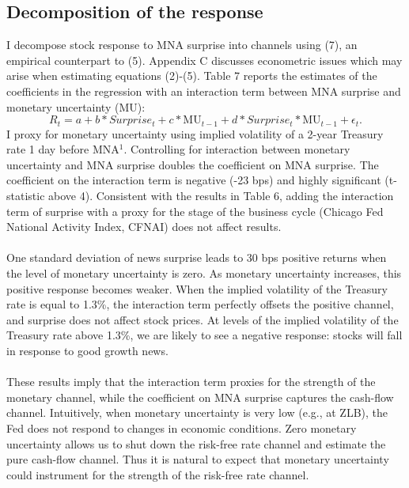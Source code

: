 \documentclass[12pt]{article}
\begin{document}
\subsection{Decomposition of the response} \label{sec:Model}

I decompose stock response to MNA surprise into channels using (7), an empirical counterpart to (5). Appendix C discusses econometric issues which may arise when estimating equations (2)-(5). Table 7 reports the estimates of the coefficients in the regression with an interaction term between MNA surprise and monetary uncertainty (MU):
\begin{equation}
    R_t = a + b*Surprise_t + c*\text{MU}_{t-1} + d*Surprise_t*\text{MU}_{t-1} + \epsilon_t.
\end{equation}
I proxy for monetary uncertainty using implied volatility of a 2-year Treasury rate 1 day before MNA$^1$. Controlling for interaction between monetary uncertainty and MNA surprise doubles the coefficient on MNA surprise. The coefficient on the interaction term is negative (-23 bps) and highly significant (t-statistic above 4). Consistent with the results in Table 6, adding the interaction term of surprise with a proxy for the stage of the business cycle (Chicago Fed National Activity Index, CFNAI) does not affect results.
\paragraph{}
One standard deviation of news surprise leads to 30 bps positive returns when the level of monetary uncertainty is zero. As monetary uncertainty increases, this positive response becomes weaker. When the implied volatility of the Treasury rate is equal to 1.3\%, the interaction term perfectly offsets the positive channel, and surprise does not affect stock prices. At levels of the implied volatility of the Treasury rate above 1.3\%, we are likely to see a negative response: stocks will fall in response to good growth news. 
\paragraph{}
These results imply that the interaction term proxies for the strength of the monetary channel, while the coefficient on MNA surprise captures the cash-flow channel. Intuitively, when monetary uncertainty is very low (e.g., at ZLB), the Fed does not respond to changes in economic conditions. Zero monetary uncertainty allows us to shut down the risk-free rate channel and estimate the pure cash-flow channel. Thus it is natural to expect that monetary uncertainty could instrument for the strength of the risk-free rate channel.
\end{document}
